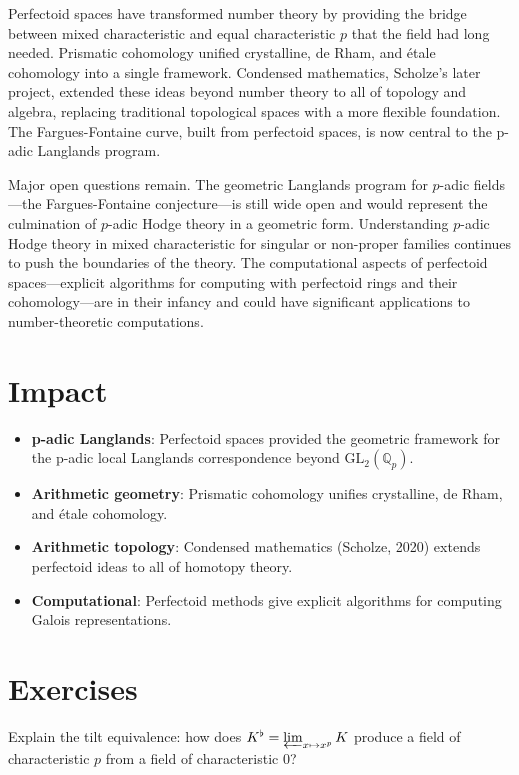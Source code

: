 Perfectoid spaces have transformed number theory by providing the bridge between mixed characteristic and equal characteristic $p$ that the field had long needed. Prismatic cohomology unified crystalline, de Rham, and étale cohomology into a single framework. Condensed mathematics, Scholze's later project, extended these ideas beyond number theory to all of topology and algebra, replacing traditional topological spaces with a more flexible foundation. The Fargues-Fontaine curve, built from perfectoid spaces, is now central to the p-adic Langlands program.

Major open questions remain. The geometric Langlands program for $p$-adic fields---the Fargues-Fontaine conjecture---is still wide open and would represent the culmination of $p$-adic Hodge theory in a geometric form. Understanding $p$-adic Hodge theory in mixed characteristic for singular or non-proper families continues to push the boundaries of the theory. The computational aspects of perfectoid spaces---explicit algorithms for computing with perfectoid rings and their cohomology---are in their infancy and could have significant applications to number-theoretic computations.

\section{Impact}
\begin{itemize}
\item \textbf{p-adic Langlands}: Perfectoid spaces provided the geometric framework for the p-adic local Langlands correspondence beyond $\text{GL}_2(\mathbb{Q}_p)$.
\item \textbf{Arithmetic geometry}: Prismatic cohomology unifies crystalline, de Rham, and \'etale cohomology.
\item \textbf{Arithmetic topology}: Condensed mathematics (Scholze, 2020) extends perfectoid ideas to all of homotopy theory.
\item \textbf{Computational}: Perfectoid methods give explicit algorithms for computing Galois representations.
\end{itemize}

\section{Exercises}

\begin{exercise}[Intermediate]
Explain the tilt equivalence: how does $K^\flat = \varprojlim_{x \mapsto x^p} K$ produce a field of characteristic $p$ from a field of characteristic $0$?
\end{exercise}

